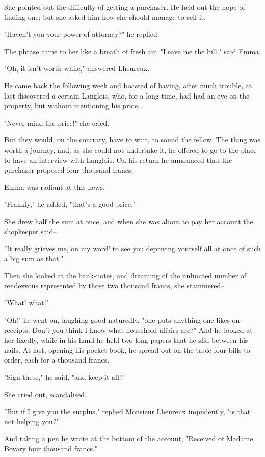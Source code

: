 \documentclass{tufte-book}
\begin{document}
She pointed out the difficulty of getting a purchaser. He held out the
hope of finding one; but she asked him how she should manage to sell it.

"Haven't you your power of attorney?" he replied.

The phrase came to her like a breath of fresh air. "Leave me the bill,"
said Emma.

"Oh, it isn't worth while," answered Lheureux.

He came back the following week and boasted of having, after much
trouble, at last discovered a certain Langlois, who, for a long time,
had had an eye on the property, but without mentioning his price.

"Never mind the price!" she cried.

But they would, on the contrary, have to wait, to sound the fellow.
The thing was worth a journey, and, as she could not undertake it, he
offered to go to the place to have an interview with Langlois. On his
return he announced that the purchaser proposed four thousand francs.

Emma was radiant at this news.

"Frankly," he added, "that's a good price."

She drew half the sum at once, and when she was about to pay her account
the shopkeeper said--

"It really grieves me, on my word! to see you depriving yourself all at
once of such a big sum as that."

Then she looked at the bank-notes, and dreaming of the unlimited number
of rendezvous represented by those two thousand francs, she stammered--

"What! what!"

"Oh!" he went on, laughing good-naturedly, "one puts anything one likes
on receipts. Don't you think I know what household affairs are?" And he
looked at her fixedly, while in his hand he held two long papers that he
slid between his nails. At last, opening his pocket-book, he spread out
on the table four bills to order, each for a thousand francs.

"Sign these," he said, "and keep it all!"

She cried out, scandalised.

"But if I give you the surplus," replied Monsieur Lheureux impudently,
"is that not helping you?"

And taking a pen he wrote at the bottom of the account, "Received of
Madame Bovary four thousand francs."
\end{document}
